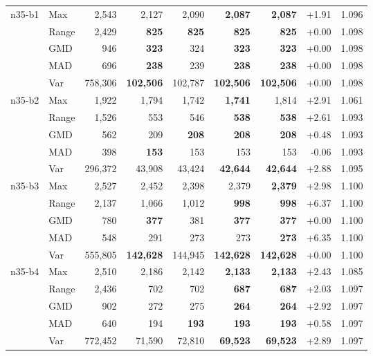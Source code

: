 \begin{small}
\begin{longtable}{llrrrrrrr}
n35-b1 & Max & 2,543 & 2,127 & 2,090 & \textbf{2,087} & \textbf{2,087} & +1.91 & 1.096 \\
 & Range & 2,429 & \textbf{825} & \textbf{825} & \textbf{825} & \textbf{825} & +0.00 & 1.098 \\
 & GMD & 946 & \textbf{323} & 324 & \textbf{323} & \textbf{323} & +0.00 & 1.098 \\
 & MAD & 696 & \textbf{238} & 239 & \textbf{238} & \textbf{238} & +0.00 & 1.098 \\
 & Var & 758,306 & \textbf{102,506} & 102,787 & \textbf{102,506} & \textbf{102,506} & +0.00 & 1.098 \\
n35-b2 & Max & 1,922 & 1,794 & 1,742 & \textbf{1,741} & 1,814 & +2.91 & 1.061 \\
 & Range & 1,526 & 553 & 546 & \textbf{538} & \textbf{538} & +2.61 & 1.093 \\
 & GMD & 562 & 209 & \textbf{208} & \textbf{208} & \textbf{208} & +0.48 & 1.093 \\
 & MAD & 398 & \textbf{153} & 153 & 153 & 153 & -0.06 & 1.093 \\
 & Var & 296,372 & 43,908 & 43,424 & \textbf{42,644} & \textbf{42,644} & +2.88 & 1.095 \\
n35-b3 & Max & 2,527 & 2,452 & 2,398 & 2,379 & \textbf{2,379} & +2.98 & 1.100 \\
 & Range & 2,137 & 1,066 & 1,012 & \textbf{998} & \textbf{998} & +6.37 & 1.100 \\
 & GMD & 780 & \textbf{377} & 381 & \textbf{377} & \textbf{377} & +0.00 & 1.100 \\
 & MAD & 548 & 291 & 273 & 273 & \textbf{273} & +6.35 & 1.100 \\
 & Var & 555,805 & \textbf{142,628} & 144,945 & \textbf{142,628} & \textbf{142,628} & +0.00 & 1.100 \\
n35-b4 & Max & 2,510 & 2,186 & 2,142 & \textbf{2,133} & \textbf{2,133} & +2.43 & 1.085 \\
 & Range & 2,436 & 702 & 702 & \textbf{687} & \textbf{687} & +2.03 & 1.097 \\
 & GMD & 902 & 272 & 275 & \textbf{264} & \textbf{264} & +2.92 & 1.097 \\
 & MAD & 640 & 194 & \textbf{193} & \textbf{193} & \textbf{193} & +0.58 & 1.097 \\
 & Var & 772,452 & 71,590 & 72,810 & \textbf{69,523} & \textbf{69,523} & +2.89 & 1.097 \\
\end{longtable}
\end{small}
